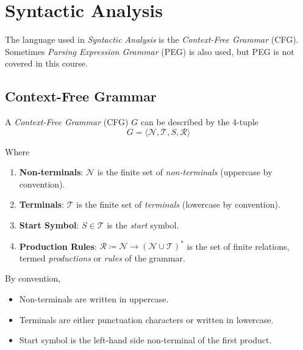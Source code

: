 \section{Syntactic Analysis}

The language used in \textit{Syntactic Analysis} is the \textit{Context-Free Grammar} (CFG). Sometimes \textit{Parsing Expression Grammar} (PEG) is also used, but PEG is not covered in this course.

\subsection{Context-Free Grammar}

\begin{definition}
    A \textit{Context-Free Grammar} (CFG) $G$ can be described by the 4-tuple
    \begin{equation}
        G = \langle
            \mathcal{N},
            \mathcal{T},
            S,
            \mathcal{R}
        \rangle
    \end{equation}
    
    Where
    \begin{enumerate}
        \item \textbf{Non-terminals}: $\mathcal{N}$ is the finite set of \textit{non-terminals} (uppercase by convention).
        \item \textbf{Terminals}: $\mathcal{T}$ is the finite set of \textit{terminals} (lowercase by convention).
        \item \textbf{Start Symbol}: $S \in \mathcal{T}$ is the \textit{start} symbol.
        \item \textbf{Production Rules}: $\mathcal{R} \coloneqq \mathcal{N} \to (\mathcal{N} \cup \mathcal{T})^\ast$ is the set of finite relations, termed \textit{productions} or \textit{rules} of the grammar.
    \end{enumerate}
\end{definition}

\begin{remark}
    By convention,
    \begin{itemize}
        \item Non-terminals are written in uppercase.
        \item Terminals are either punctuation characters or written in lowercase.
        \item Start symbol is the left-hand side non-terminal of the first product.
    \end{itemize}
\end{remark}

